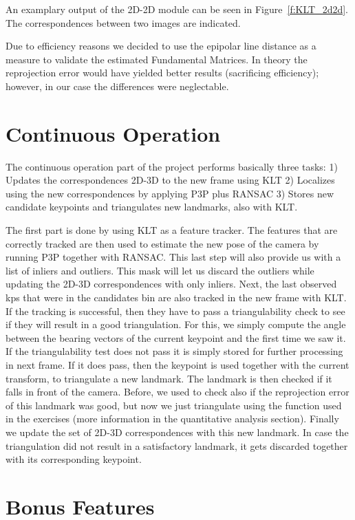 An examplary output of the 2D-2D module can be seen in Figure~\ref{f:KLT_2d2d}. The correspondences between two images are indicated.

Due to efficiency reasons we decided to use the epipolar line distance as a measure to validate the estimated Fundamental Matrices. In theory the reprojection error would have yielded better results (sacrificing efficiency); however, in our case the differences were neglectable.

\section{Continuous Operation}
\label{s:ContOp}
The continuous operation part of the project performs basically three tasks:
1) Updates the correspondences 2D-3D to the new frame using KLT
2) Localizes using the new correspondences by applying P3P plus RANSAC
3) Stores new candidate keypoints and triangulates new landmarks, also with KLT.

The first part is done by using KLT as a feature tracker. The features that are correctly tracked are then used to estimate the new pose of the camera
by running P3P together with RANSAC. This last step will also provide us with a list of inliers and outliers.
This mask will let us discard the outliers while updating the 2D-3D correspondences with only inliers.
Next, the last observed kps that were in the candidates bin are also tracked in the new frame with KLT. If the tracking is successful, then
they have to pass a triangulability check to see if they will result in a good triangulation.
For this, we simply compute the angle between the bearing vectors of the current keypoint and the first time we saw it.
If the triangulability test does not pass it is simply stored for further processing in next frame.
If it does pass, then the keypoint is used together with the current transform, to triangulate a new landmark.
The landmark is then checked if it falls in front of the camera.
Before, we used to check also if the reprojection error of this landmark was
good, but now we just triangulate using the function used in the exercises (more information in the quantitative analysis section).
Finally we update the set of 2D-3D correspondences with this new landmark.
In case the triangulation did not result in a satisfactory landmark, it gets discarded together with its corresponding keypoint.


\section{Bonus Features}
\label{s:BF}

